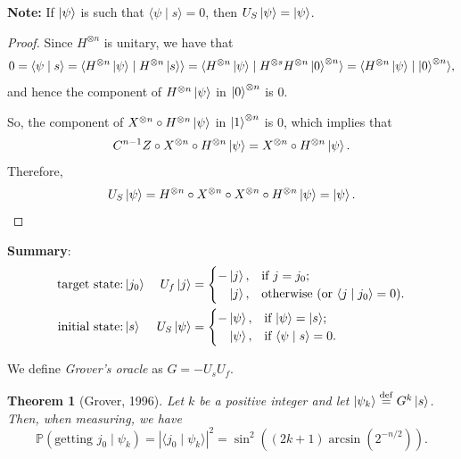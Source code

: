 \documentclass[12pt]{amsart}
\theoremstyle{plain}
\newtheorem{theorem}{Theorem}[section]
\theoremstyle{definition}
\theoremstyle{remarks}
\newcommand{\idef}{\overset{{\rm def}}{=}}
\newcommand{\abs}[1]{\left| #1 \right|}
\newcommand{\prob}{\mathbb{P}}
\begin{document}
\textbf{Note:} If $\ket{\psi}$ is such that $\langle \psi \mid s  \rangle = 0$, then $U_S \ket{\psi} = \ket{\psi}$.

\begin{proof}
  Since $H^{\otimes n}$ is unitary, we have that
  \[
    0 = \langle \psi \mid s  \rangle = \langle H^{\otimes n} \ket{\psi} \mid  H^{\otimes n} \ket{s} \rangle = \langle H^{\otimes n} \ket{\psi} \mid H^{\otimes s} H^{\otimes n} \ket{0}^{\otimes n} \rangle = \langle H^{\otimes n }\ket{\psi} \mid \ket{0}^{\otimes n} \rangle,
  \]
  and hence the component of $H^{\otimes n} \ket{\psi}$ in $\ket{0}^{\otimes n}$ is $0$.

  So, the component of $X^{\otimes n} \circ H^{\otimes n} \ket{\psi}$ in $\ket{1}^{\otimes n}$ is $0$, which implies that
  \[
    C^{n-1}Z \circ X^{\otimes n} \circ H^{\otimes n} \ket{\psi} =  X^{\otimes n} \circ H^{\otimes n} \ket{\psi}.
  \]
  Therefore,
  \[
    U_S \ket{\psi} = H^{\otimes n} \circ X^{\otimes n} \circ X^{\otimes n} \circ H^{\otimes n} \ket{\psi} = \ket{\psi}.
  \]
\end{proof}


\textbf{Summary}:
\begin{align*}
  \text{target state:}& \ket{j_0} & U_f \ket{j} &=
                              \begin{cases}
                                - \ket{j},& \text{if $j = j_0$;} \\
                                \phantom{-} \ket{j},& \text{otherwise (or $\langle j \mid j_0  \rangle = 0$)}.
                              \end{cases} \\
  \text{initial state:}& \ket{s} & U_S \ket{\psi} &=
                              \begin{cases}
                                - \ket{\psi},& \text{if $\ket{\psi} = \ket{s}$;} \\
                                \phantom{-} \ket{\psi},& \text{if $\langle \psi \mid s \rangle = 0$}.
                              \end{cases} \\
\end{align*}

We define \emph{Grover's oracle} as $G = - U_s U_f$.
\begin{theorem}[Grover, 1996]
  Let $k$ be a positive integer and let $\ket{\psi_k} \idef G^k \ket{s}$.  Then, when measuring, we have
  \[
    \prob(\text{getting $j_0$} \mid \psi_k) = \abs{\langle j_0 \mid \psi_k \rangle}^2 = \sin^2 \left( (2k+1) \arcsin \left( 2^{-n/2} \right) \right).
  \]
\end{theorem}
\end{document}
